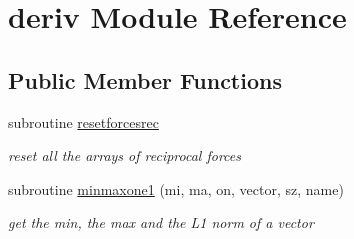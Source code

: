 \hypertarget{classderiv}{\section{deriv Module Reference}
\label{classderiv}
}
\subsection*{Public Member Functions}
\begin{DoxyCompactItemize}
\item 
subroutine \hyperlink{classderiv_abd1159fb3bf608089b480ee145ee2a0d}{resetforcesrec}
\begin{DoxyCompactList}\small\item\em reset all the arrays of reciprocal forces \end{DoxyCompactList}\item 
subroutine \hyperlink{classderiv_a17ac13399fdc8964fe2243fb5f3b40aa}{minmaxone1} (mi, ma, on, vector, sz, name)
\begin{DoxyCompactList}\small\item\em get the min, the max and the L1 norm of a vector \end{DoxyCompactList}\end{DoxyCompactItemize}
